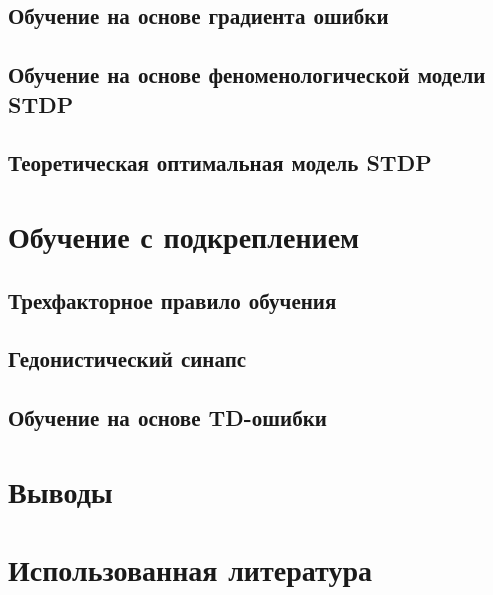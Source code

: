 \documentclass[a4paper,10pt]{article}
\begin{document}
\subsection{Обучение на основе градиента ошибки}
\subsection{Обучение на основе феноменологической модели STDP}
\subsection{Теоретическая оптимальная модель STDP}
\section{Обучение с подкреплением}
\subsection{Трехфакторное правило обучения}
\subsection{Гедонистический синапс}
\subsection{Обучение на основе TD-ошибки}
\section{Выводы}
\section{Использованная литература}
{}

\end{document}
